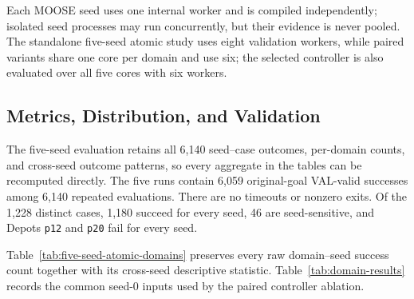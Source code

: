 Each MOOSE seed uses one internal worker and is compiled independently; isolated
seed processes may run concurrently, but their evidence is never pooled. The
standalone five-seed atomic study uses eight validation workers, while paired
variants share one core per domain and use six; the selected controller is also
evaluated over all five cores with six workers.

\subsection{Metrics, Distribution, and Validation}

The five-seed evaluation retains all 6,140 seed--case outcomes, per-domain
counts, and cross-seed outcome
patterns, so every aggregate in the tables can be recomputed directly. The five
runs contain 6,059 original-goal VAL-valid successes among
6,140 repeated evaluations. There are no timeouts or nonzero exits. Of the
1,228 distinct cases, 1,180 succeed for every seed, 46 are seed-sensitive, and
Depots \texttt{p12} and \texttt{p20} fail for every seed.

Table~\ref{tab:five-seed-atomic-domains} preserves every raw domain--seed
success count together with its cross-seed descriptive statistic.
Table~\ref{tab:domain-results} records the common seed-0 inputs used by the
paired controller ablation.

